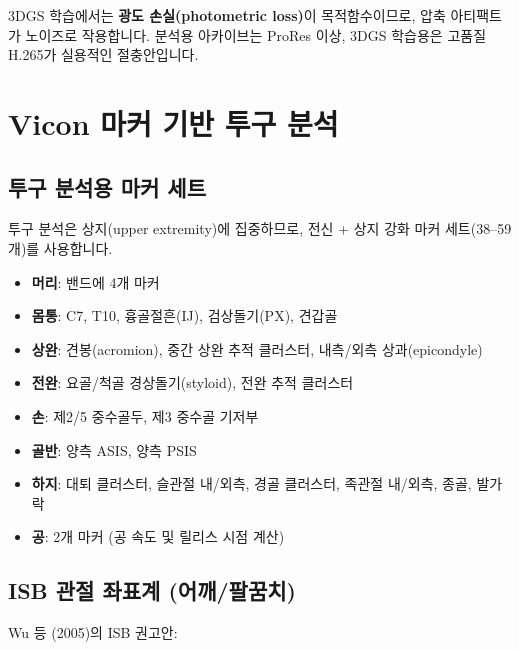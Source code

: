 \documentclass[11pt, a4paper]{report}
\begin{document}
\begin{remark}
3DGS 학습에서는 \textbf{광도 손실(photometric loss)}이 목적함수이므로, 압축 아티팩트가 노이즈로 작용합니다. 분석용 아카이브는 ProRes 이상, 3DGS 학습용은 고품질 H.265가 실용적인 절충안입니다.
\end{remark}


\chapter{Vicon 마커 기반 투구 분석}
\label{ch:vicon_pitching}

\section{투구 분석용 마커 세트}

투구 분석은 상지(upper extremity)에 집중하므로, 전신 + 상지 강화 마커 세트(38--59개)를 사용합니다.

\begin{biomechbox}[title={투구 분석 마커 세트 (상지 강화)}]
\begin{itemize}[leftmargin=*]
  \item \textbf{머리}: 밴드에 4개 마커
  \item \textbf{몸통}: C7, T10, 흉골절흔(IJ), 검상돌기(PX), 견갑골
  \item \textbf{상완}: 견봉(acromion), 중간 상완 추적 클러스터, 내측/외측 상과(epicondyle)
  \item \textbf{전완}: 요골/척골 경상돌기(styloid), 전완 추적 클러스터
  \item \textbf{손}: 제2/5 중수골두, 제3 중수골 기저부
  \item \textbf{골반}: 양측 ASIS, 양측 PSIS
  \item \textbf{하지}: 대퇴 클러스터, 슬관절 내/외측, 경골 클러스터, 족관절 내/외측, 종골, 발가락
  \item \textbf{공}: 2개 마커 (공 속도 및 릴리스 시점 계산)
\end{itemize}
\end{biomechbox}

\section{ISB 관절 좌표계 (어깨/팔꿈치)}

Wu 등 (2005)의 ISB 권고안:
\end{document}
